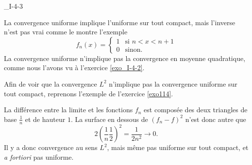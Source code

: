 

\begin{corrige}{_I-4-3}

La convergence uniforme implique l'uniforme sur tout compact, mais l'inverse n'est pas vrai comme le montre l'exemple
\begin{equation}
	f_n(x)=\begin{cases}
	1	&	\text{si $n<x<n+1$}\\
	0	&	 \text{sinon.}
\end{cases}
\end{equation}
La convergence uniforme n'implique pas la convergence en moyenne quadratique, comme nous l'avons vu à l'exercice \ref{exo_I-4-2}.

Afin de voir que la convergence $L^2$ n'implique pas la convergence uniforme sur tout compact, reprenons l'exemple de l'exercice \ref{exo114}.



La différence entre la limite et les fonctions $f_n$ est composée des deux triangles de base $\frac{1}{ n }$ et de hauteur $1$. La surface en dessous de $(f_n-f)^2$ n'est donc autre que
\begin{equation}
	2\left( \frac{1}{ n }\frac{1}{ 2 } \right)^2=\frac{1}{ 2n^2 }\to 0.
\end{equation}
Il y a donc convergence au sens $L^2$, mais même pas uniforme sur tout compact, et \emph{a fortiori} pas uniforme.

\end{corrige}
